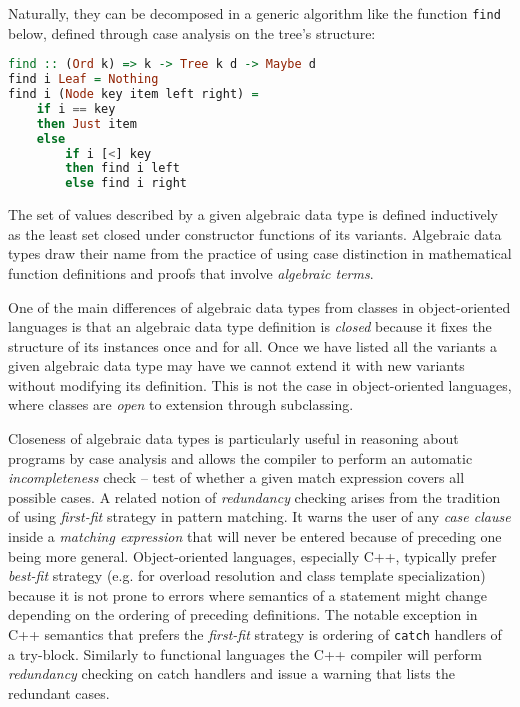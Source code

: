 \documentclass[preprint]{sigplanconf}
\DeclareRobustCommand{\code}[1]{{\lstinline[breaklines=false]{#1}}}
\begin{document}
Naturally, they can be decomposed in a generic algorithm like the function 
\code{find} below, defined through case analysis on the tree's structure:

\begin{lstlisting}[language=Haskell]
find :: (Ord k) => k -> Tree k d -> Maybe d
find i Leaf = Nothing
find i (Node key item left right) = 
    if i == key 
    then Just item 
    else 
        if i [<] key 
        then find i left 
        else find i right
\end{lstlisting}

The set of values described by a given algebraic data type is defined 
inductively as the least set closed under constructor functions of its variants.
Algebraic data types draw their name from the practice of using case distinction 
in mathematical function definitions and proofs that involve \emph{algebraic 
terms}.

One of the main differences of algebraic data types from classes in 
object-oriented languages is that an algebraic data type definition is 
\emph{closed} because it fixes the structure of its instances once and for all. 
Once we have listed all the variants a given algebraic data type may have we 
cannot extend it with new variants without modifying its definition. This is not 
the case in object-oriented languages, where classes are \emph{open} to 
extension through subclassing. 

Closeness of algebraic data types is particularly useful in reasoning about 
programs by case analysis and allows the compiler to perform an automatic 
\emph{incompleteness} check -- test of whether a given match expression covers all 
possible cases. A related notion of \emph{redundancy} checking arises from the 
tradition of using \emph{first-fit} strategy in pattern matching. It warns the 
user of any \emph{case clause} inside a \emph{matching expression} that will 
never be entered because of preceding one being more general. Object-oriented 
languages, especially C++, typically prefer \emph{best-fit} strategy (e.g. for 
overload resolution and class template specialization) because it is not prone 
to errors where semantics of a statement might change depending on the ordering 
of preceding definitions. The notable exception in C++ semantics that prefers 
the \emph{first-fit} strategy is ordering of \code{catch} handlers of a 
try-block. Similarly to functional languages the C++ compiler will perform 
\emph{redundancy} checking on catch handlers and issue a warning that lists the 
redundant cases.
\end{document}
